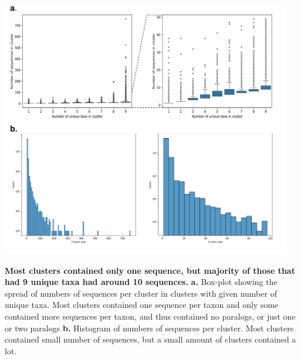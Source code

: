 \documentclass[two column, twoside, a4paper]{article}
\begin{document}
\begin{suppfigure*}
  \begin{center}
    \includegraphics[width=0.95\textwidth]{figures/Figure_1.png}
  \end{center}
  \caption{\sf\textbf{Most clusters contained only one sequence, but majority of those that had 9 unique taxa had around 10 sequences.} \textbf{a.} Box-plot showing the spread of numbers of sequences per cluster in clusters with given number of unique taxa. Most clusters contained one sequence per taxon and only some contained more sequences per taxon, and thus contained no paralogs, or just one or two paralogs \textbf{b.} Histogram of numbers of sequences per cluster. Most clusters contained small number of sequences, but a small amount of clusters contained a lot.} 
  \label{fig:clustering}
\end{suppfigure*}
\end{document}
